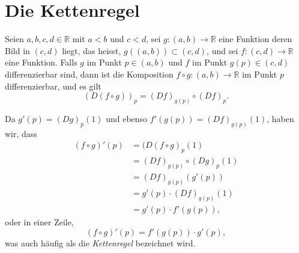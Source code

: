 \documentclass[../main.tex]{subfiles}
\begin{document}
\section{Die Kettenregel}

\begin{chainrule}
Seien 
$a, b, c, d \in \mathbb{R}$ mit $a < b$ und $c < d$,
sei $g \colon (a, b) \to \mathbb{R}$ 
eine Funktion
deren Bild in $(c, d)$ liegt, das heisst,
$g((a, b)) \subset (c, d)$,
und sei $f \colon (c, d) \to \mathbb{R}$ eine Funktion.
Falls $g$ im Punkt $p \in (a, b)$ und $f$ 
im Punkt $g(p) \in (c, d)$ differenzierbar sind,
dann ist die Komposition
$f \circ g \colon (a, b) \to \mathbb{R}$ 
im Punkt $p$ differenzierbar, und es gilt
\[
  {(D(f \circ g))}_p = {(Df)}_{g(p)} \circ {(Df)}_p.
\]
\end{chainrule}

\begin{remark}
  Da $g'(p) = {(Dg)}_p(1)$ und
  ebenso $f'(g(p)) = {(Df)}_{g(p)}(1)$,
  haben wir, dass
  \begin{align*}
    (f \circ g)'(p)
    & = {(D(f \circ g)}_p(1) \\
    & = {(Df)}_{g(p)} \circ {(Dg)}_p(1) \\
    & = {(Df)}_{g(p)}(g'(p)) \\
    & = g'(p) \cdot {(Df)}_{g(p)}(1) \\
    & = g'(p) \cdot f'(g(p)),
  \end{align*}
  oder in einer Zeile,
  \[
    (f \circ g)'(p) = f'(g(p)) \cdot g'(p),
  \]
  was auch häufig als die \emph{Kettenregel}
  bezeichnet wird.
\end{remark}
\end{document}

